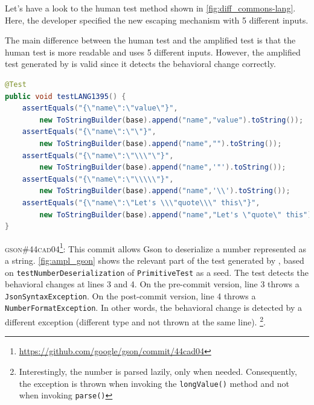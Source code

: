 Let's have a look to the human test method shown in \autoref{fig:diff_commons-lang}.
Here, the developer specified the new escaping mechanism with 5 different inputs.

The main difference between the human test and the amplified test is that the human test is more readable and uses 5 different inputs.
However, the amplified test generated by \DCI is valid since it detects the behavioral change correctly.

\begin{lstlisting}[language=java,caption=Developer test for \textsc{e7d16c2} of commons-lang.,label=fig:diff_commons-lang]
@Test
public void testLANG1395() {
	assertEquals("{\"name\":\"value\"}",
		new ToStringBuilder(base).append("name","value").toString());
	assertEquals("{\"name\":\"\"}",
		new ToStringBuilder(base).append("name","").toString());
	assertEquals("{\"name\":\"\\\"\"}",
		new ToStringBuilder(base).append("name",'"').toString());
	assertEquals("{\"name\":\"\\\\\"}",
		new ToStringBuilder(base).append("name",'\\').toString());
	assertEquals("{\"name\":\"Let's \\\"quote\\\" this\"}",
		new ToStringBuilder(base).append("name","Let's \"quote\" this").toString());
}
\end{lstlisting}

\textsc{gson\#44cad04}\footnote{\url{https://github.com/google/gson/commit/44cad04}}: This commit allows Gson to deserialize a number represented as a string.
\autoref{fig:ampl_gson} shows the relevant part of the test generated by \DCII, based on \texttt{testNumberDeserialization} of \texttt{PrimitiveTest} as a seed.
The \DCI test detects the behavioral changes at lines 3 and 4.
On the pre-commit version, line 3 throws a \texttt{JsonSyntaxException}.
On the post-commit version, line 4 throws a \texttt{NumberFormatException}.
In other words, the behavioral change is detected by a different exception (different type and not thrown at the same line).
\footnote{Interestingly, the number is parsed lazily, only when needed. 
Consequently, the exception is thrown when invoking the \texttt{longValue()} method and not when invoking \texttt{parse()}}.


